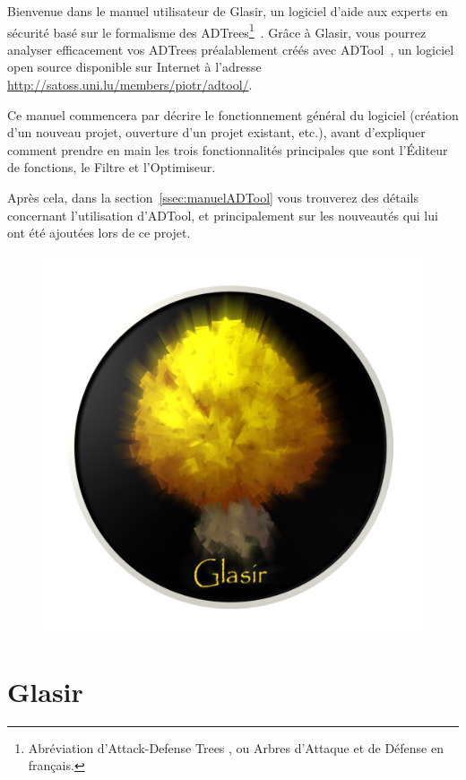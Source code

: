 Bienvenue dans le manuel utilisateur de Glasir, un logiciel d'aide aux experts en sécurité basé sur le formalisme des ADTrees\footnote{Abréviation d'\og Attack-Defense Trees \fg{}, ou \og Arbres d'Attaque et de Défense\fg{} en français.}~\cite{ADTrees}. Grâce à Glasir, vous pourrez analyser efficacement vos ADTrees préalablement créés avec ADTool~\cite{adtool}, un logiciel open source disponible sur Internet à l'adresse \url{http://satoss.uni.lu/members/piotr/adtool/}.

Ce manuel commencera par décrire le fonctionnement général du logiciel (création d'un nouveau projet, ouverture d'un projet existant, etc.), avant d'expliquer comment prendre en main les trois fonctionnalités principales que sont l'Éditeur de fonctions, le Filtre et l'Optimiseur. 

Après cela, dans la {\sc section}~\ref{ssec:manuelADTool} vous trouverez des détails concernant l'utilisation d'ADTool, et principalement sur les nouveautés qui lui ont été ajoutées lors de ce projet.

\vspace{20mm}
	\begin{figure}[H]
        \centering
        \includegraphics[height=0.8\textwidth]{figure/glasir.png}
    \end{figure}
    
    \newpage

\section{Glasir}
\label{ssec:manuelGlasir}

